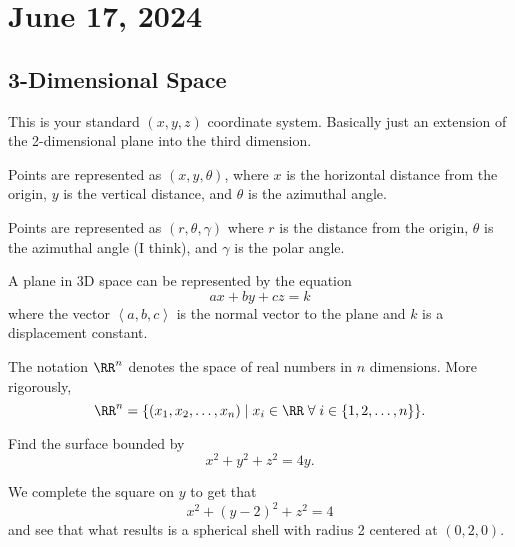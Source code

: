 \chapter{June 17, 2024}

\section{3-Dimensional Space}

\begin{definition}
    This is your standard $(x, y, z)$ coordinate system. Basically just an extension of the 2-dimensional plane into the third dimension.
\end{definition}

\begin{definition}
    Points are represented as $(x, y, \theta)$, where $x$ is the horizontal distance from the origin, $y$ is the vertical distance, and $\theta$ is the azimuthal angle.
\end{definition}

\begin{definition}
    Points are represented as $(r, \theta, \gamma)$ where $r$ is the distance from the origin, $\theta$ is the azimuthal angle (I think), and $\gamma$ is the polar angle.
\end{definition}

\begin{definition}
    A plane in 3D space can be represented by the equation
    \[ax + by + cz = k\]
    where the vector $\left<a, b, c\right>$ is the normal vector to the plane and $k$ is a displacement constant.
\end{definition}

\begin{definition}
    The notation $\RR^{n}$ denotes the space of real numbers in $n$ dimensions. More rigorously,
    \[\RR^{n} = \{(x_{1}, x_{2}, \dots, x_{n}) \mid x_{i} \in \RR \; \forall \; i \in \{1, 2, \dots, n\}\}.\]
\end{definition}

\begin{example}
    Find the surface bounded by
    \[x^{2} + y^{2} + z^{2} = 4y.\]

    \begin{soln}
        We complete the square on $y$ to get that
        \[x^{2} + (y - 2)^{2} + z^{2} = 4\]
        and see that what results is a spherical shell with radius 2 centered at $(0, 2, 0)$.
    \end{soln}
\end{example}

